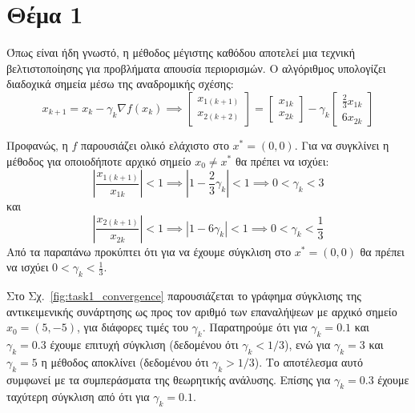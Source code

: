 \documentclass[a4paper,12pt]{article}
\begin{document}
\section*{Θέμα 1}
Όπως είναι ήδη γνωστό, η μέθοδος μέγιστης καθόδου αποτελεί μια τεχνική βελτιστοποίησης για προβλήματα απουσία 
περιορισμών. Ο αλγόριθμος υπολογίζει διαδοχικά σημεία μέσω της αναδρομικής σχέσης: 
\begin{equation}
    x_{k+1} = x_k - \gamma_k \nabla f(x_k) \implies 
    \begin{bmatrix} x_{1(k+1)} \\ x_{2(k+2)} \end{bmatrix} = 
    \begin{bmatrix} x_{1k} \\ x_{2k} \end{bmatrix}
     - \gamma_k \begin{bmatrix} \frac{2}{3} x_{1k} \\ 6 x_{2k} \end{bmatrix}
\end{equation}

Προφανώς, η $f$ παρουσιάζει ολικό ελάχιστο στο $x^* = (0,0)$. Για να συγκλίνει η μέθοδος για οποιοδήποτε αρχικό
σημείο $x_0 \neq x^*$ θα πρέπει να ισχύει:
\begin{equation}
    \left|\frac{x_{1(k+1)}}{x_{1k}}\right| < 1 \implies \left|1 - \frac{2}{3} \gamma_k \right| < 1 
    \implies 0 < \gamma_k < 3
\end{equation}
και
\begin{equation}
    \left|\frac{x_{2(k+1)}}{x_{2k}}\right| < 1 \implies \left|1 - 6 \gamma_k \right| < 1 
    \implies 0 < \gamma_k < \frac{1}{3}
\end{equation}
Από τα παραπάνω προκύπτει ότι για να έχουμε σύγκλιση στο $x^* = (0,0)$ θα πρέπει να ισχύει $0 < \gamma_k < \frac{1}{3}$.

Στο Σχ.~\ref{fig:task1_convergence} παρουσιάζεται το γράφημα σύγκλισης της αντικειμενικής συνάρτησης ως προς τον αριθμό 
των επαναλήψεων με αρχικό σημείο $x_0 = (5, -5)$, για διάφορες τιμές του $\gamma_k$. Παρατηρούμε ότι για $\gamma_k = 0.1$ 
και $\gamma_k = 0.3$ έχουμε επιτυχή σύγκλιση (δεδομένου ότι $\gamma_k < 1/3$), ενώ για $\gamma_k = 3$ και $\gamma_k = 5$
η μέθοδος αποκλίνει (δεδομένου ότι $\gamma_k > 1/3$). Το αποτέλεσμα αυτό συμφωνεί με τα συμπεράσματα της θεωρητικής 
ανάλυσης. Επίσης για $\gamma_k = 0.3$ έχουμε ταχύτερη σύγκλιση από ότι για $\gamma_k = 0.1$.
\end{document}
